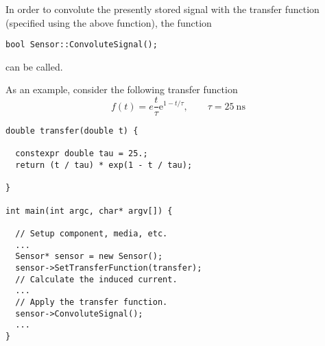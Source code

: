 In order to convolute the presently stored signal with the 
transfer function (specified using the above function), 
the function
\begin{lstlisting}
bool Sensor::ConvoluteSignal();
\end{lstlisting}
can be called. 

As an example, consider the following transfer function
\begin{equation*}
  f\left(t\right) = e\frac{t}{\tau}\text{e}^{1 - t/\tau}, \qquad
  \tau = 25~\text{ns}
\end{equation*}

\begin{lstlisting}
double transfer(double t) {

  constexpr double tau = 25.;
  return (t / tau) * exp(1 - t / tau);

}

int main(int argc, char* argv[]) {

  // Setup component, media, etc.
  ...
  Sensor* sensor = new Sensor();
  sensor->SetTransferFunction(transfer);
  // Calculate the induced current.
  ...
  // Apply the transfer function.
  sensor->ConvoluteSignal();
  ...
}
 
\end{lstlisting}
